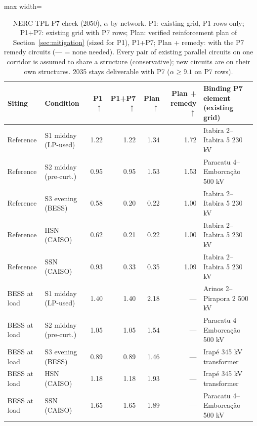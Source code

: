 \begin{table}[!htbp]
\centering
\scriptsize
\caption{NERC TPL P7 check (2050), $\alpha$ by network. P1: existing grid, P1 rows only; P1+P7: existing grid with P7 rows; Plan: verified reinforcement plan of Section~\ref{sec:mitigation} (sized for P1), P1+P7; Plan + remedy: with the P7 remedy circuits (--- = none needed). Every pair of existing parallel circuits on one corridor is assumed to share a structure (conservative); new circuits are on their own structures. 2035 stays deliverable with P7 ($\alpha\ge9.1$ on P7 rows).}
\label{tab:p7}
\begin{adjustbox}{max width=\linewidth}
\begin{tabular}{llrrrrl}
\toprule
Siting & Condition & P1 $\uparrow$ & P1+P7 $\uparrow$ & Plan $\uparrow$ & Plan + remedy $\uparrow$ & Binding P7 element (existing grid) \\
\midrule
Reference & S1 midday (LP-used) & 1.22 & 1.22 & 1.34 & 1.72 & Itabira 2–Itabira 5 230 kV \\
Reference & S2 midday (pre-curt.) & 0.95 & 0.95 & 1.53 & 1.53 & Paracatu 4–Emborcação 500 kV \\
Reference & S3 evening (BESS) & 0.58 & 0.20 & 0.22 & 1.00 & Itabira 2–Itabira 5 230 kV \\
Reference & HSN (CAISO) & 0.62 & 0.21 & 0.22 & 1.00 & Itabira 2–Itabira 5 230 kV \\
Reference & SSN (CAISO) & 0.93 & 0.33 & 0.35 & 1.09 & Itabira 2–Itabira 5 230 kV \\
BESS at load & S1 midday (LP-used) & 1.40 & 1.40 & 2.18 & — & Arinos 2–Pirapora 2 500 kV \\
BESS at load & S2 midday (pre-curt.) & 1.05 & 1.05 & 1.54 & — & Paracatu 4–Emborcação 500 kV \\
BESS at load & S3 evening (BESS) & 0.89 & 0.89 & 1.46 & — & Irapé 345 kV transformer \\
BESS at load & HSN (CAISO) & 1.18 & 1.18 & 1.93 & — & Irapé 345 kV transformer \\
BESS at load & SSN (CAISO) & 1.65 & 1.65 & 1.89 & — & Paracatu 4–Emborcação 500 kV \\
\bottomrule
\end{tabular}
\end{adjustbox}
\end{table}
